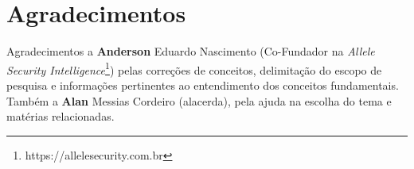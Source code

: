 \documentclass[
	article,			    %
	12pt,				    %
	oneside,			    %
	a4paper,			    %
	chapter=TITLE,		    %
	section=TITLE,		    %
	subsection=TITLE,	    %
	english,			    %
	brazil,				    %
	sumario=tradicional
]{abntex2}
\begin{document}
\section*{Agradecimentos}
Agradecimentos a \textbf{Anderson} Eduardo Nascimento (Co-Fundador na \emph{Allele Security Intelligence}\footnote{https://allelesecurity.com.br}) pelas correções de conceitos, delimitação do escopo de pesquisa e informações pertinentes ao entendimento dos conceitos fundamentais. Também a \textbf{Alan} Messias Cordeiro (alacerda), pela ajuda na escolha do tema e matérias relacionadas.
\end{document}
